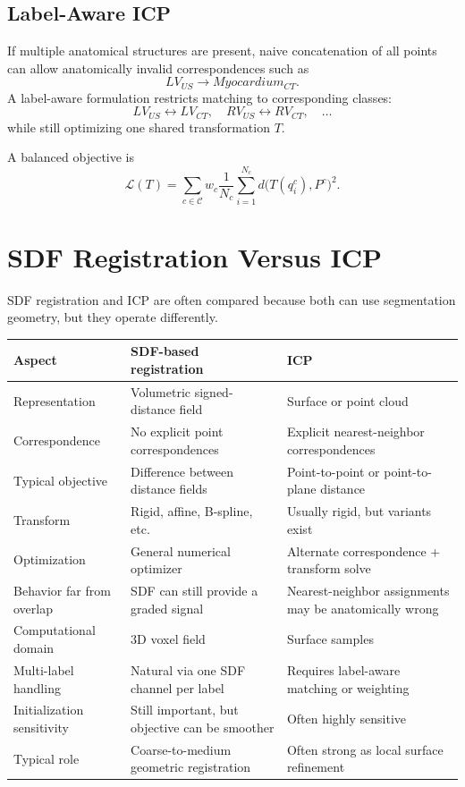 \documentclass[11pt,a4paper]{article}
\newcommand{\Loss}{\mathcal{L}}
\begin{document}
\subsection{Label-Aware ICP}

If multiple anatomical structures are present, naive concatenation of all points can allow anatomically invalid correspondences such as
\[
LV_{US}\to Myocardium_{CT}.
\]
A label-aware formulation restricts matching to corresponding classes:
\[
LV_{US}\leftrightarrow LV_{CT},
\quad
RV_{US}\leftrightarrow RV_{CT},
\quad \ldots
\]
while still optimizing one shared transformation $T$.

A balanced objective is
\[
\Loss(T)
=
\sum_{c\in\mathcal{C}}
 w_c
 \frac{1}{N_c}
 \sum_{i=1}^{N_c}
 d\bigl(T(q_i^c),P^c\bigr)^2.
\]

\section{SDF Registration Versus ICP}

SDF registration and ICP are often compared because both can use segmentation geometry, but they operate differently.

\begin{longtable}{p{}p{}p{}}
\toprule
\textbf{Aspect} & \textbf{SDF-based registration} & \textbf{ICP}\\
\midrule
Representation & Volumetric signed-distance field & Surface or point cloud\\
Correspondence & No explicit point correspondences & Explicit nearest-neighbor correspondences\\
Typical objective & Difference between distance fields & Point-to-point or point-to-plane distance\\
Transform & Rigid, affine, B-spline, etc. & Usually rigid, but variants exist\\
Optimization & General numerical optimizer & Alternate correspondence + transform solve\\
Behavior far from overlap & SDF can still provide a graded signal & Nearest-neighbor assignments may be anatomically wrong\\
Computational domain & 3D voxel field & Surface samples\\
Multi-label handling & Natural via one SDF channel per label & Requires label-aware matching or weighting\\
Initialization sensitivity & Still important, but objective can be smoother & Often highly sensitive\\
Typical role & Coarse-to-medium geometric registration & Often strong as local surface refinement\\
\bottomrule
\end{longtable}
\end{document}
